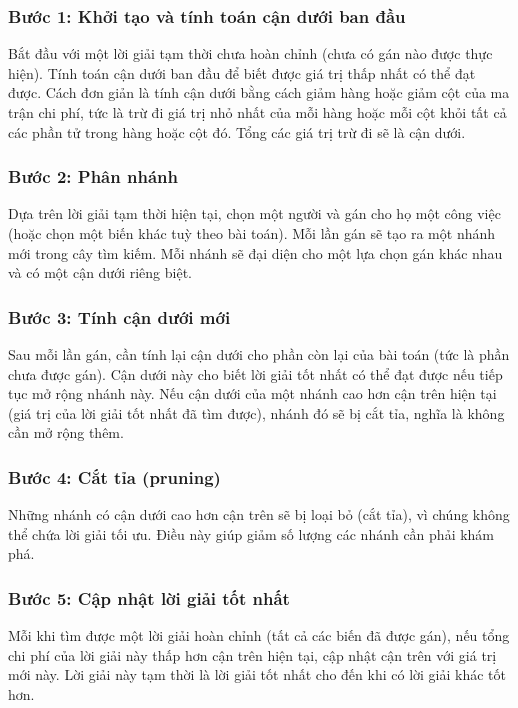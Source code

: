 \subsubsection*{Bước 1: Khởi tạo và tính toán cận dưới ban đầu}
Bắt đầu với một lời giải tạm thời chưa hoàn chỉnh (chưa có gán nào được thực hiện). Tính toán cận dưới ban đầu để biết được giá trị thấp nhất có thể đạt được. Cách đơn giản là tính cận dưới bằng cách giảm hàng hoặc giảm cột của ma trận chi phí, tức là trừ đi giá trị nhỏ nhất của mỗi hàng hoặc mỗi cột khỏi tất cả các phần tử trong hàng hoặc cột đó. Tổng các giá trị trừ đi sẽ là cận dưới.

\subsubsection*{Bước 2: Phân nhánh}
Dựa trên lời giải tạm thời hiện tại, chọn một người và gán cho họ một công việc (hoặc chọn một biến khác tuỳ theo bài toán). Mỗi lần gán sẽ tạo ra một nhánh mới trong cây tìm kiếm. Mỗi nhánh sẽ đại diện cho một lựa chọn gán khác nhau và có một cận dưới riêng biệt.

\subsubsection*{Bước 3: Tính cận dưới mới}
Sau mỗi lần gán, cần tính lại cận dưới cho phần còn lại của bài toán (tức là phần chưa được gán). Cận dưới này cho biết lời giải tốt nhất có thể đạt được nếu tiếp tục mở rộng nhánh này. Nếu cận dưới của một nhánh cao hơn cận trên hiện tại (giá trị của lời giải tốt nhất đã tìm được), nhánh đó sẽ bị cắt tỉa, nghĩa là không cần mở rộng thêm.

\subsubsection*{Bước 4: Cắt tỉa (pruning)}
Những nhánh có cận dưới cao hơn cận trên sẽ bị loại bỏ (cắt tỉa), vì chúng không thể chứa lời giải tối ưu. Điều này giúp giảm số lượng các nhánh cần phải khám phá.

\subsubsection*{Bước 5: Cập nhật lời giải tốt nhất}
Mỗi khi tìm được một lời giải hoàn chỉnh (tất cả các biến đã được gán), nếu tổng chi phí của lời giải này thấp hơn cận trên hiện tại, cập nhật cận trên với giá trị mới này. Lời giải này tạm thời là lời giải tốt nhất cho đến khi có lời giải khác tốt hơn.

